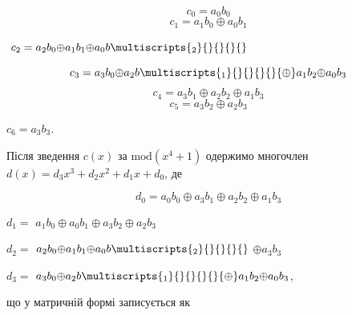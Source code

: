 \begin{equation*}
{c_{{0}}=a_{{0}}b_{{0}}}
\end{equation*}
\begin{equation*}
{c_{{1}}=a_{{1}}b_{{0}}{\oplus}a_{{0}}b_{{1}}}
\end{equation*}
{\centering  $ $
${c_{{2}}=a_{{2}}b_{{0}}{\oplus}a_{{1}}b_{{1}}{\oplus}a_{{0}}b\multiscripts{_{{2}}}{}{}{\text{}}{}}$\par}

\begin{equation*}
{c_{{3}}=a_{{3}}b_{{0}}{\oplus}a_{{2}}b\multiscripts{_{{1}}}{}{}{\text{}}{}{\oplus}a_{{1}}b_{{2}}{\oplus}a_{{0}}b_{{3}}}
\end{equation*}
\begin{equation*}
{c_{{4}}=a_{{3}}b_{{1}}{\oplus}a_{{2}}b_{{2}}{\oplus}a_{{1}}b_{{3}}}
\end{equation*}
\begin{equation*}
{c_{{5}}=a_{{3}}b_{{2}}{\oplus}a_{{2}}b_{{3}}}
\end{equation*}
{\centering
 ${c_{{6}}=a_{{3}}b_{{3}}}$.
\par}


\bigskip

Після зведення  ${c(x)}$ за  ${\text{mod}(x^{{4}}+1)}$ одержимо многочлен 
${d(x)=d_{{3}}x^{{3}}+d_{{2}}x^{{2}}+d_{{1}}x+d_{{0}}}$, де 


\bigskip

\begin{equation*}
{d_{{0}}=a_{{0}}b_{{0}}{\oplus}a_{{3}}b_{{1}}{\oplus}a_{{2}}b_{{2}}{\oplus}a_{{1}}b_{{3}}}
\end{equation*}
{\centering  ${d_{{1}}=}$
${a_{{1}}b_{{0}}{\oplus}a_{{0}}b_{{1}}{\oplus}a_{{3}}b_{{2}}{\oplus}a_{{2}}b_{{3}}}$\par}

{\centering  ${d_{{2}}=}$
${a_{{2}}b_{{0}}{\oplus}a_{{1}}b_{{1}}{\oplus}a_{{0}}b\multiscripts{_{{2}}}{}{}{\text{}}{}}$
${{\oplus}a_{{3}}b_{{3}}}$\par}

{\centering
 ${d_{{3}}=}$
${a_{{3}}b_{{0}}{\oplus}a_{{2}}b\multiscripts{_{{1}}}{}{}{\text{}}{}{\oplus}a_{{1}}b_{{2}}{\oplus}a_{{0}}b_{{3}}}$,
\par}


\bigskip

що у матричній формі записується як


\bigskip

